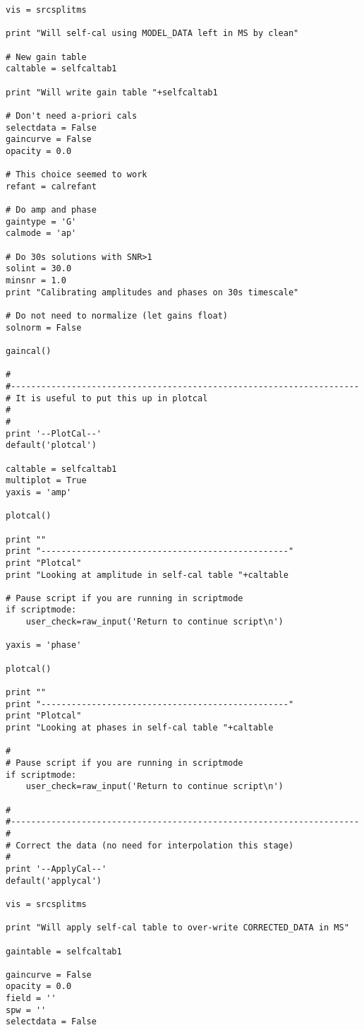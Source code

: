 \begin{verbatim}
vis = srcsplitms

print "Will self-cal using MODEL_DATA left in MS by clean"

# New gain table
caltable = selfcaltab1

print "Will write gain table "+selfcaltab1

# Don't need a-priori cals
selectdata = False
gaincurve = False
opacity = 0.0

# This choice seemed to work
refant = calrefant

# Do amp and phase
gaintype = 'G'
calmode = 'ap'

# Do 30s solutions with SNR>1
solint = 30.0
minsnr = 1.0
print "Calibrating amplitudes and phases on 30s timescale"

# Do not need to normalize (let gains float)
solnorm = False

gaincal()

#
#---------------------------------------------------------------------
# It is useful to put this up in plotcal
#
#
print '--PlotCal--'
default('plotcal')

caltable = selfcaltab1
multiplot = True
yaxis = 'amp'

plotcal()

print ""
print "-------------------------------------------------"
print "Plotcal"
print "Looking at amplitude in self-cal table "+caltable

# Pause script if you are running in scriptmode
if scriptmode:
    user_check=raw_input('Return to continue script\n')

yaxis = 'phase'

plotcal()

print ""
print "-------------------------------------------------"
print "Plotcal"
print "Looking at phases in self-cal table "+caltable

#
# Pause script if you are running in scriptmode
if scriptmode:
    user_check=raw_input('Return to continue script\n')

#
#---------------------------------------------------------------------
#
# Correct the data (no need for interpolation this stage)
#
print '--ApplyCal--'
default('applycal')

vis = srcsplitms

print "Will apply self-cal table to over-write CORRECTED_DATA in MS"

gaintable = selfcaltab1

gaincurve = False
opacity = 0.0
field = ''
spw = ''
selectdata = False


\end{verbatim}
